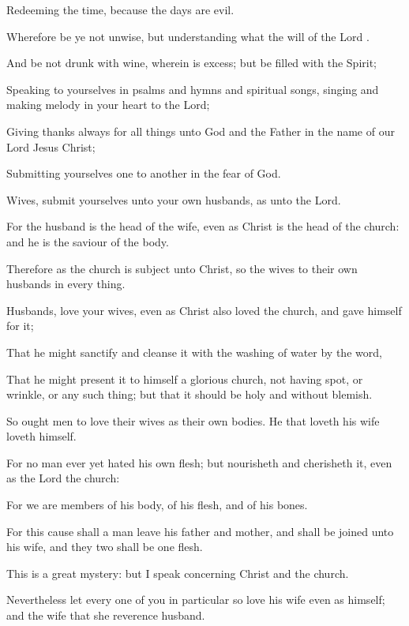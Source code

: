 {Redeeming the
time,
because the
days
are
evil.

Wherefore be
ye
not
unwise,
but
understanding
what the
will of the
Lord
{}.

And
be
not
drunk
with
wine,
wherein
is
excess;
but be
filled
with the
Spirit;

Speaking to
yourselves in
psalms
and
hymns
and
spiritual
songs,
singing
and making
melody
in
your
heart to the
Lord;

Giving
thanks
always
for all
things unto
God
and the
Father
in the
name of
our
Lord
Jesus
Christ;

Submitting yourselves one to
another
in the
fear of
God.

Wives, submit yourselves
unto your
own
husbands,
as unto the
Lord.

For the
husband
is the
head of the
wife,
even
as Christ
is the
head of the
church:
and
he
is the
saviour of the
body.

Therefore
as the
church is subject
unto
Christ,
so
{} the
wives
{} to their
own
husbands
in every
thing.

Husbands,
love
your
wives, even
as
Christ
also
loved the
church,
and
gave
himself
for
it;

That
he might
sanctify and cleanse
it with the
washing of
water
by the
word,

That he might
present
it to
himself a
glorious
church,
not
having
spot,
or
wrinkle,
or
any such
thing;
but
that it should
be
holy
and without
blemish.

So
ought
men to
love
their
wives
as their
own
bodies. He
that
loveth
his
wife
loveth
himself.

For no
man ever
yet
hated his
own
flesh;
but
nourisheth
and
cherisheth
it,
even
as the
Lord the
church:

For we
are
members of
his
body,
of
his
flesh,
and
of
his
bones.

For this
cause
shall a
man
leave
his
father
and
mother,
and shall be
joined
unto
his
wife,
and
they
two shall
be
one
flesh.

This
is a
great
mystery:
but
I
speak
concerning
Christ
and the
church.

Nevertheless
let every
one of
you in
particular
so
love
his
wife even
as
himself;
and the
wife
{}
that she
reverence
{}
husband.




}
